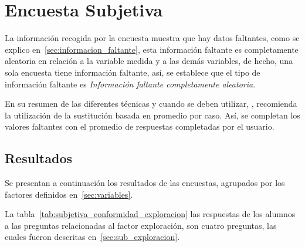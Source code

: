 \section{Encuesta Subjetiva}
\label{sec:res_subjetiva}

La información recogida por la encuesta muestra que hay datos faltantes, como se
explico en~\ref{sec:informacion_faltante}, esta información faltante es
completamente aleatoria en relación a la variable medida y a las demás
variables, de hecho, una sola encuesta tiene información faltante, así, se
establece que el tipo de información faltante es \emph{Información faltante
    completamente aleatoria}.

En su resumen de las diferentes técnicas y cuando se deben utilizar,
\cite{tsikriktsis2005review}, recomienda la utilización de la sustitución basada
en promedio por caso. Así, se completan los valores faltantes con el promedio de
respuestas completadas por el usuario.

\subsection{Resultados}
\label{sec:res_subjetiva}

Se presentan a continuación los resultados de las encuestas, agrupados por los
factores definidos en~\ref{sec:variables}.

La tabla~\ref{tab:subjetiva_conformidad_exploracion} 
las respuestas de los alumnos a las preguntas relacionadas al factor
exploración, son cuatro preguntas, las cuales fueron descritas
en~\ref{sec:sub_exploracion}. 

